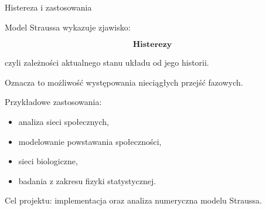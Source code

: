 \documentclass{beamer}
\begin{document}

\begin{frame}{Histereza i zastosowania}

Model Straussa wykazuje zjawisko:

\[
\textbf{Histerezy}
\]

czyli zależności aktualnego stanu układu od jego historii.

\vspace{0.5cm}

Oznacza to możliwość występowania nieciągłych przejść fazowych.

\vspace{0.4cm}

Przykładowe zastosowania:

\begin{itemize}
    \item analiza sieci społecznych,
    \item modelowanie powstawania społeczności,
    \item sieci biologiczne,
    \item badania z zakresu fizyki statystycznej.
\end{itemize}

\vspace{0.4cm}

Cel projektu: implementacja oraz analiza numeryczna modelu Straussa.

\end{frame}



\end{document}
